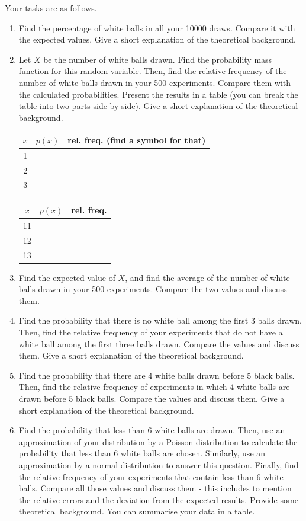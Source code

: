 \documentclass[12pt]{article}
\theoremstyle{definition}
\begin{document}
	Your tasks are as follows.
	\begin{enumerate}
 		\item Find the percentage of white balls in all your 10000 draws. Compare it with the expected values. Give a short explanation of the theoretical background.
 		\item Let $X$ be the number of white balls drawn. Find the probability mass function for this random variable. Then, find the relative frequency of the number of white balls drawn in your 500 experiments.
 		Compare them with the calculated probabilities. Present the results in a table (you can break the table into two parts side by side). Give a short explanation of the theoretical background.
 		
 		\begin{tabular}{|c|c|c|}
 			\hline 
 			$x$ & $p(x)$ & rel. freq. (find a symbol for that)\\ 
 			\hline 
 			1 & & \\
 			\hline 
 			2 & & \\
 			\hline 
 			3 & & \\
 			\hline 
 		\end{tabular} \begin{tabular}{|c|c|c|}
 		\hline 
 		$x$ & $p(x)$ & rel. freq. \\ 
 		\hline 
 		11 & & \\
 		\hline 
 		12 & & \\
 		\hline 
 		13 & & \\
 		\hline 
 		\end{tabular} 
 		
 		
 		
 		\item Find the expected value of $X$, and find the average of the number of white balls drawn in your 500 experiments. Compare the two values and discuss them. 
 		\item Find the probability that there is no white ball among the first 3 balls drawn. Then, find the relative frequency of your experiments that do not have a white ball among the first three balls drawn. Compare the values and discuss them. Give a short explanation of the theoretical background.
 		\item Find the probability that there are 4 white balls drawn before 5 black balls.
 		Then, find the relative frequency of experiments in which 4 white balls are drawn before 5 black balls.
 		Compare the values and discuss them. Give a short explanation of the theoretical background.
 		\item Find the probability that less than 6 white balls are drawn. Then, use an approximation of your distribution by a Poisson distribution to calculate the probability that less than 6 white balls are chosen. Similarly, use an approximation by a normal distribution to answer this question. Finally, find the relative frequency of your experiments that contain less than 6 white balls. Compare all those values and discuss them - this includes to mention the relative errors and the deviation from the expected results. Provide some theoretical background. You can summarise your data in a table.
 \end{enumerate}
 
\end{document}
